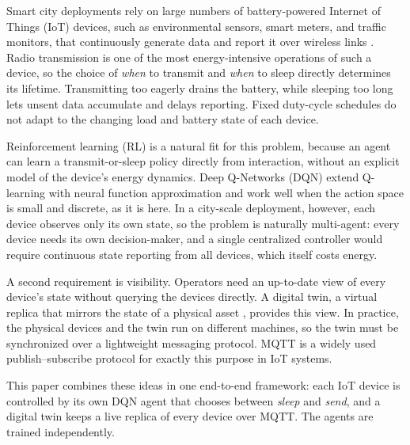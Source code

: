 \documentclass[conference]{IEEEtran}
\begin{document}
Smart city deployments rely on large numbers of battery-powered Internet of Things (IoT) devices, such as environmental sensors, smart meters, and traffic monitors, that continuously generate data and report it over wireless links \cite{zanella2014}. Radio transmission is one of the most energy-intensive operations of such a device, so the choice of \emph{when} to transmit and \emph{when} to sleep directly determines its lifetime. Transmitting too eagerly drains the battery, while sleeping too long lets unsent data accumulate and delays reporting. Fixed duty-cycle schedules do not adapt to the changing load and battery state of each device.

Reinforcement learning (RL) is a natural fit for this problem, because an agent can learn a transmit-or-sleep policy directly from interaction, without an explicit model of the device's energy dynamics. Deep Q-Networks (DQN) \cite{mnih2015} extend Q-learning with neural function approximation and work well when the action space is small and discrete, as it is here. In a city-scale deployment, however, each device observes only its own state, so the problem is naturally multi-agent: every device needs its own decision-maker, and a single centralized controller would require continuous state reporting from all devices, which itself costs energy.

A second requirement is visibility. Operators need an up-to-date view of every device's state without querying the devices directly. A digital twin, a virtual replica that mirrors the state of a physical asset \cite{grieves2017}, provides this view. In practice, the physical devices and the twin run on different machines, so the twin must be synchronized over a lightweight messaging protocol. MQTT \cite{mqtt} is a widely used publish--subscribe protocol for exactly this purpose in IoT systems.

This paper combines these ideas in one end-to-end framework: each IoT device is controlled by its own DQN agent that chooses between \emph{sleep} and \emph{send}, and a digital twin keeps a live replica of every device over MQTT. The agents are trained independently.
\end{document}
